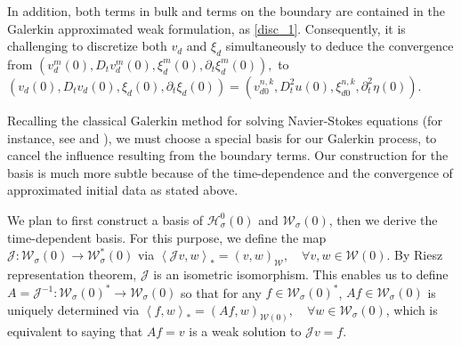 \documentclass[letterpaper,reqno,10pt,twoside]{amsart}
\theoremstyle{definition}
\theoremstyle{remark}
\def\p{\partial}
\begin{document}
	In addition, both terms in bulk and terms on the boundary are contained in the Galerkin approximated weak formulation, as \eqref{disc_1}. Consequently, it is challenging to discretize both $v_{d}$ and $\xi_{d}$ simultaneously to deduce the convergence from 
	$
	(v^{m}_{d}(0),D_{t}v^{m}_{d}(0),\xi_{d}^{m}(0),\p_{t}\xi_{d}^{m}(0)),$
	to $
	(v_{d}(0),D_{t}v_{d}(0),\xi_{d}(0),\p_{t}\xi_{d}(0))=(v_{d0}^{n,k}, D_t^2 u(0), \xi_{d0}^{n,k}, \p_t^2\eta(0)) $.
	
	Recalling the classical Galerkin method for solving Navier-Stokes equations (for instance, see \cite{boyer_fabrie} and \cite{Te}), we must choose a special basis for our Galerkin process, to cancel the influence resulting from the boundary terms. Our construction for the basis is much more subtle because of the time-dependence and the convergence of approximated initial data as stated above. 
	
	We plan to first construct a basis of $\mathcal{H}_{\sigma}^0(0)$ and $\mathcal{W}_{\sigma}(0)$, then we derive the time-dependent basis. For this purpose,
	we define the map $\mathcal{J}:\mathcal{W}_{\sigma}(0)\rightarrow \mathcal{W}^{\ast}_{\sigma}(0)$ via
	$\left<\mathcal{J}v, w\right>_\ast=(v, w)_{\mathcal{W}},\quad \forall v, w\in \mathcal{W}(0)$.
	By Riesz representation theorem, $\mathcal{J}$ is an isometric isomorphism. This enables us to define $A=\mathcal{J}^{-1}: \mathcal{W}_{\sigma}(0)^\ast\rightarrow \mathcal{W}_{\sigma}(0)$ so that for any $f\in \mathcal{W}_{\sigma}(0)^\ast$, $Af\in \mathcal{W}_{\sigma}(0)$ is uniquely determined via
	$\left<f, w\right>_\ast=(Af, w)_{\mathcal{W}(0)},\quad \forall w\in \mathcal{W}_{\sigma}(0)$,
	which is equivalent to saying that $Af=v$ is a weak solution to $\mathcal{J}v=f$.
	
\end{document}
